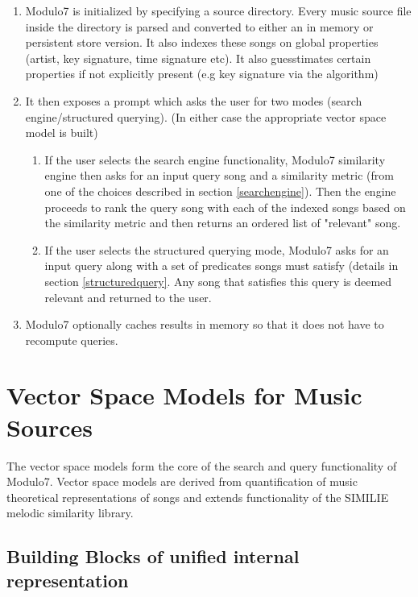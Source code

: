 \documentclass{article}
\begin{document}
\begin{enumerate}
\item Modulo7 is initialized by specifying a source directory. Every music source file inside the directory  is parsed and converted to either an in memory or persistent store version. It also indexes these songs on global properties (artist, key signature, time signature etc). It also guesstimates certain properties if not explicitly present (e.g key signature via the \cite{kkTonalityKeyFinding} algorithm)
\item It then exposes a prompt which asks the user for two modes (search engine/structured querying). (In either case the appropriate vector space model is built)
\begin{enumerate}
\item If the user selects the search engine functionality, Modulo7 similarity engine then asks for an input query song and a similarity metric (from one of the choices described in section \ref{searchengine}). Then the engine proceeds to rank the query song with each of the indexed songs based on the similarity metric and then returns an ordered list of "relevant" song. 
\item If the user selects the structured querying mode, Modulo7 asks for an input query along with a set of predicates songs must satisfy (details in section \ref{structuredquery}. Any song that satisfies this query is deemed relevant and returned to the user.  
\end{enumerate}
\item Modulo7 optionally caches results in memory so that it does not have to recompute queries.

\end{enumerate}

\section{Vector Space Models for Music Sources} \label{vecmodels}

The vector space models form the core of the search and query functionality of Modulo7. Vector space models are derived from quantification of music theoretical representations of songs and extends functionality of the SIMILIE \cite{similie} melodic similarity library.

\subsection{Building Blocks of unified internal representation}
\end{document}
